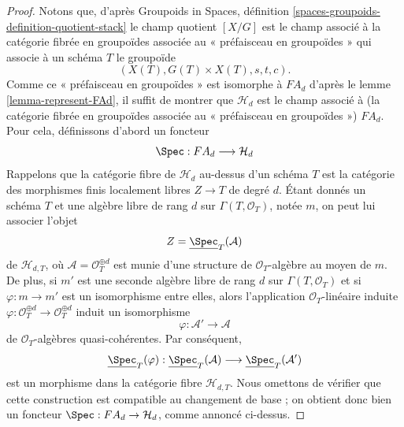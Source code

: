 \begin{proof}
Notons que, d'après
Groupoids in Spaces, définition
\ref{spaces-groupoids-definition-quotient-stack}
le champ quotient $[X/G]$ est le champ associé à la
catégorie fibrée en groupoïdes associée au « préfaisceau en groupoïdes »
qui associe à un schéma $T$ le groupoïde
$$
(X(T), G(T) \times X(T), s, t, c).
$$
Comme ce « préfaisceau en groupoïdes » est isomorphe à $FA_d$ d'après le
lemme \ref{lemma-represent-FAd},
il suffit de montrer que $\mathcal{H}_d$ est le champ associé
à (la catégorie fibrée en groupoïdes associée au
« préfaisceau en groupoïdes ») $FA_d$. Pour cela, définissons d'abord un
foncteur
$$
\Spec : FA_d \longrightarrow \mathcal{H}_d
$$
Rappelons que la catégorie fibre de $\mathcal{H}_d$ au-dessus d'un schéma $T$
est la catégorie des morphismes finis localement libres $Z \to T$ de degré $d$.
Étant donnés un schéma $T$ et une algèbre libre de rang $d$
sur $\Gamma(T, \mathcal{O}_T)$, notée $m$, on peut lui associer l'objet
$$
Z = \underline{\Spec}_T(\mathcal{A})
$$
de $\mathcal{H}_{d, T}$,
où $\mathcal{A} = \mathcal{O}_T^{\oplus d}$ est munie d'une
structure de $\mathcal{O}_T$-algèbre au moyen de $m$. De plus, si $m'$ est
une seconde algèbre libre de rang $d$ sur $\Gamma(T, \mathcal{O}_T)$
et si $\varphi : m \to m'$ est un isomorphisme entre elles, alors
l'application $\mathcal{O}_T$-linéaire induite
$\varphi : \mathcal{O}_T^{\oplus d} \to \mathcal{O}_T^{\oplus d}$
induit un isomorphisme
$$
\varphi : \mathcal{A}' \longrightarrow \mathcal{A}
$$
de $\mathcal{O}_T$-algèbres quasi-cohérentes. Par conséquent,
$$
\underline{\Spec}_T(\varphi) :
\underline{\Spec}_T(\mathcal{A})
\longrightarrow
\underline{\Spec}_T(\mathcal{A}')
$$
est un morphisme dans la catégorie fibre $\mathcal{H}_{d, T}$. Nous omettons de
vérifier que cette construction est compatible au changement de base ; on
obtient donc bien un foncteur $\Spec : FA_d \to \mathcal{H}_d$,
comme annoncé ci-dessus.


\end{proof}
